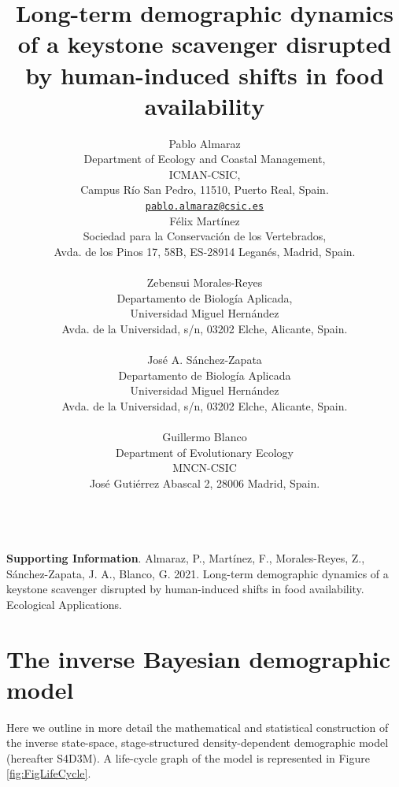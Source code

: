 \documentclass[12pt,a4paper]{article}
\title{Long-term demographic dynamics of a keystone scavenger disrupted by
	human-induced shifts in food availability}
\author{
	Pablo Almaraz
	\\
	Department of Ecology and Coastal Management, \\
	ICMAN-CSIC, \\
	Campus Río San Pedro, 11510, Puerto Real, Spain.\\  \texttt{\href{mailto:pablo.almaraz@csic.es}{\nolinkurl{pablo.almaraz@csic.es}}} \\
	\And
	Félix Martínez
	\\
	Sociedad para la Conservación de los Vertebrados, \\
	Avda. de los Pinos 17, 58B, ES-28914 Leganés, Madrid, Spain. \\
	\texttt{} \\
	\And
	Zebensui Morales-Reyes
	\\
	Departamento de Biología Aplicada, \\
	Universidad Miguel Hernández \\
	Avda. de la Universidad, s/n, 03202 Elche, Alicante, Spain. \\
	\texttt{} \\
	\And
	José A. Sánchez-Zapata
	\\
	Departamento de Biología Aplicada \\
	Universidad Miguel Hernández \\
	Avda. de la Universidad, s/n, 03202 Elche, Alicante, Spain. \\
	\texttt{} \\
	\And
	Guillermo Blanco
	\\
	Department of Evolutionary Ecology \\
	MNCN-CSIC \\
	José Gutiérrez Abascal 2, 28006 Madrid, Spain. \\
	\texttt{} \\
}
\begin{document}
\large{\textbf{Supporting Information}. Almaraz, P., Martínez, F., Morales-Reyes, Z., Sánchez-Zapata, J. A., Blanco, G. 2021. Long-term demographic dynamics of a keystone scavenger disrupted by human-induced shifts in food availability. Ecological Applications.}

\vspace{0.1in}




\vspace{0.7in}

\def\tightlist{}

\section{The inverse Bayesian demographic model}

Here we outline in more detail the mathematical and statistical construction of the inverse state-space, stage-structured density-dependent demographic model (hereafter S4D3M). A life-cycle graph of the model is represented in Figure \ref{fig:FigLifeCycle}.\\
\end{document}
